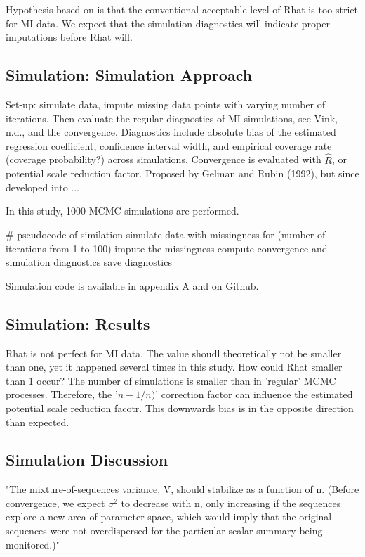\documentclass[article]{jss}
\begin{document}
Hypothesis based on \cite{lace07} is that the conventional acceptable level of Rhat is too strict for MI data. We expect that the simulation diagnostics will indicate proper imputations before Rhat will. 

\subsection{Simulation: Simulation Approach}

Set-up: simulate data, impute missing data points with varying number of iterations. Then evaluate the regular diagnostics of MI simulations, see Vink, n.d., and the convergence. Diagnostics include absolute bias of the estimated regression coefficient, confidence interval width, and empirical coverage rate (coverage probability?) across simulations. Convergence is evaluated with $\hat{R}$, or potential scale reduction factor. Proposed by Gelman and Rubin (1992), but since developed into ...

In this study, 1000 MCMC simulations are performed. 

\begin{Code}
# pseudocode of similation 
simulate data with missingness
for (number of iterations from 1 to 100)
  impute the missingness
  compute convergence and simulation diagnostics
save diagnostics
\end{Code}

Simulation code is available in appendix A and on Github.

\subsection{Simulation: Results}

Rhat is not perfect for MI data. The value shoudl theoretically not be smaller than one, yet it happened several times in this study. How could Rhat smaller than 1 occur? The number of simulations is smaller than in 'regular' MCMC processes. Therefore, the '$n-1/n)$' correction factor can influence the estimated potential scale reduction facotr. This downwards bias is in the opposite direction than expected. 

\subsection{Simulation Discussion}

"The mixture-of-sequences variance, V, should stabilize as a function of n. (Before convergence, we expect $\sigma^2$ to decrease with n, only increasing if the sequences explore a new area of parameter space, which would imply that the original sequences were not overdispersed for the particular scalar summary being monitored.)" 
\end{document}
